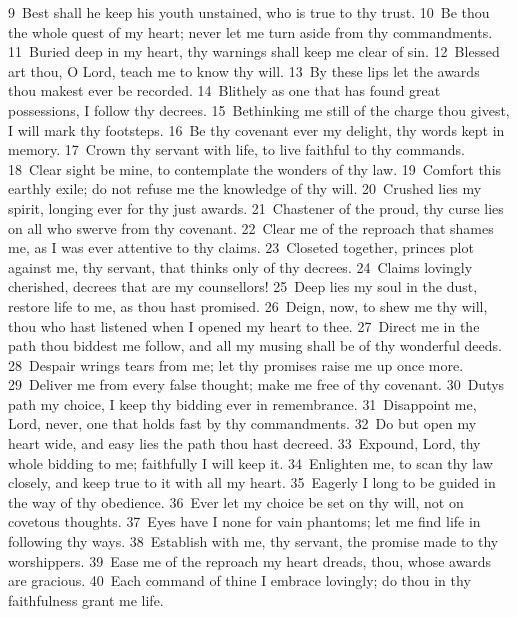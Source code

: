\documentclass[10pt]{book} %
\begin{document}
\textcolor{benred8}{9}~Best shall he keep his youth unstained, who is true to thy trust. \textcolor{benred8}{10}~Be thou the whole quest of my heart; never let me turn aside from thy commandments. \textcolor{benred8}{11}~Buried deep in my heart, thy warnings shall keep me clear of sin. \textcolor{benred8}{12}~Blessed art thou, O Lord, teach me to know thy will. \textcolor{benred8}{13}~By these lips let the awards thou makest ever be recorded. \textcolor{benred8}{14}~Blithely as one that has found great possessions, I follow thy decrees. \textcolor{benred8}{15}~Bethinking me still of the charge thou givest, I will mark thy footsteps. \textcolor{benred8}{16}~Be thy covenant ever my delight, thy words kept in memory.
\textcolor{benred8}{17}~Crown thy servant with life, to live faithful to thy commands. \textcolor{benred8}{18}~Clear sight be mine, to contemplate the wonders of thy law. \textcolor{benred8}{19}~Comfort this earthly exile; do not refuse me the knowledge of thy will. \textcolor{benred8}{20}~Crushed lies my spirit, longing ever for thy just awards. \textcolor{benred8}{21}~Chastener of the proud, thy curse lies on all who swerve from thy covenant. \textcolor{benred8}{22}~Clear me of the reproach that shames me, as I was ever attentive to thy claims. \textcolor{benred8}{23}~Closeted together, princes plot against me, thy servant, that thinks only of thy decrees. \textcolor{benred8}{24}~Claims lovingly cherished, decrees that are my counsellors!
\textcolor{benred8}{25}~Deep lies my soul in the dust, restore life to me, as thou hast promised. \textcolor{benred8}{26}~Deign, now, to shew me thy will, thou who hast listened when I opened my heart to thee. \textcolor{benred8}{27}~Direct me in the path thou biddest me follow, and all my musing shall be of thy wonderful deeds. \textcolor{benred8}{28}~Despair wrings tears from me; let thy promises raise me up once more. \textcolor{benred8}{29}~Deliver me from every false thought; make me free of thy covenant. \textcolor{benred8}{30}~Duty\textquotesingle s path my choice, I keep thy bidding ever in remembrance. \textcolor{benred8}{31}~Disappoint me, Lord, never, one that holds fast by thy commandments. \textcolor{benred8}{32}~Do but open my heart wide, and easy lies the path thou hast decreed.
\textcolor{benred8}{33}~Expound, Lord, thy whole bidding to me; faithfully I will keep it. \textcolor{benred8}{34}~Enlighten me, to scan thy law closely, and keep true to it with all my heart. \textcolor{benred8}{35}~Eagerly I long to be guided in the way of thy obedience. \textcolor{benred8}{36}~Ever let my choice be set on thy will, not on covetous thoughts. \textcolor{benred8}{37}~Eyes have I none for vain phantoms; let me find life in following thy ways. \textcolor{benred8}{38}~Establish with me, thy servant, the promise made to thy worshippers. \textcolor{benred8}{39}~Ease me of the reproach my heart dreads, thou, whose awards are gracious. \textcolor{benred8}{40}~Each command of thine I embrace lovingly; do thou in thy faithfulness grant me life.
\end{document}
